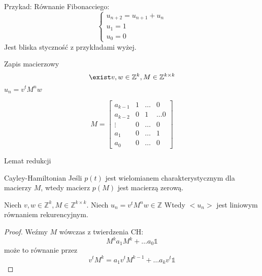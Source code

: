 \documentclass{beamer}
\theoremstyle{definition}
\begin{document}
\begin{frame}
    Przykad:
    Równanie Fibonacciego:
   \begin{equation*}
        \begin{cases}
        u_{n+2} = u_{n+1} + u_n \\
        u_{1} = 1 \\
        u_{0} = 0
        \end{cases}
    \end{equation*}
    Jest bliska styczność z przykładami wyżej. 

\end{frame}

\begin{frame}{Zapis macierzowy}
    $$\exist v, w \in \mathbb{Z}^{k}, M \in \mathbb{Z}^{k\times k} $$
    $u_n = v^{t}M^{n}w$
    
    $$
    M = \begin{bmatrix}
    a_{k-1} & 1 &  \ldots & 0 \\
    a_{k-2} & 0 & 1 & \ldots 0  \\
    \vdots & 0 & \ldots & 0 \\ 
    a_1 & 0 & \ldots & 1 \\
    a_0 & 0 & \ldots & 0
    \end{bmatrix}
    $$
\end{frame}

\begin{frame}{Lemat redukcji}

\begin{theorem}{Cayley-Hamiltonian}
    Jeśli $p(t)$ jest wielomianem charakterystycznym dla macierzy $M$, wtedy macierz $p(M)$ jest macierzą zerową. 
\end{theorem}

\begin{theorem}

    Niech $v, w \in \mathbb{Z}^{k}, M \in \mathbb{Z}^{k\times k}$.
    Niech $u_n = v^{t}M^{n}w \in \mathbb{Z}$
    Wtedy $<u_n>$ jest liniowym równaniem rekurencyjnym. 
        
\end{theorem}



\begin{proof}
    Weźmy $M$ wówczas z twierdzenia CH: 
    $$M^{k} a_1 M^{k} + \ldots a_0 \mathbb{1}$$ 
    może to równanie przez 
    $$ v^{t}M^{k} = a_1 v^{t} M^{k-1} + \ldots a_k v^{t} \mathbb{1}$$ 
\end{proof}

\end{frame}
\end{document}
